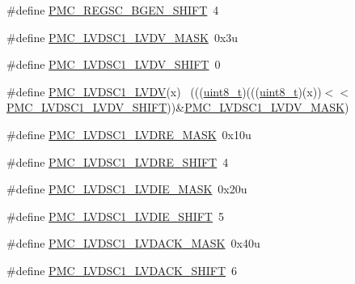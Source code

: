 \begin{DoxyCompactItemize}
\item 
\#define \hyperlink{group___p_m_c___register___masks_gab43d258e6864ee3a7a728de1d720f6fe}{P\+M\+C\+\_\+\+R\+E\+G\+S\+C\+\_\+\+B\+G\+E\+N\+\_\+\+S\+H\+I\+FT}~4
\item 
\#define \hyperlink{group___p_m_c___register___masks_ga777eada2a526d88569a30323e9d3e1d3}{P\+M\+C\+\_\+\+L\+V\+D\+S\+C1\+\_\+\+L\+V\+D\+V\+\_\+\+M\+A\+SK}~0x3u
\item 
\#define \hyperlink{group___p_m_c___register___masks_gaaf45daa6de387f93bc57f1218ab17a16}{P\+M\+C\+\_\+\+L\+V\+D\+S\+C1\+\_\+\+L\+V\+D\+V\+\_\+\+S\+H\+I\+FT}~0
\item 
\#define \hyperlink{group___p_m_c___register___masks_gaa14e8452bdb4c61c57ed23eda94f715a}{P\+M\+C\+\_\+\+L\+V\+D\+S\+C1\+\_\+\+L\+V\+DV}(x)                                          ~(((\hyperlink{_p_e___types_8h_aba7bc1797add20fe3efdf37ced1182c5}{uint8\+\_\+t})(((\hyperlink{_p_e___types_8h_aba7bc1797add20fe3efdf37ced1182c5}{uint8\+\_\+t})(x))$<$$<$\hyperlink{group___p_m_c___register___masks_gaaf45daa6de387f93bc57f1218ab17a16}{P\+M\+C\+\_\+\+L\+V\+D\+S\+C1\+\_\+\+L\+V\+D\+V\+\_\+\+S\+H\+I\+FT}))\&\hyperlink{group___p_m_c___register___masks_ga777eada2a526d88569a30323e9d3e1d3}{P\+M\+C\+\_\+\+L\+V\+D\+S\+C1\+\_\+\+L\+V\+D\+V\+\_\+\+M\+A\+SK})
\item 
\#define \hyperlink{group___p_m_c___register___masks_gad771f87e373907e3ef60e5fa31001fad}{P\+M\+C\+\_\+\+L\+V\+D\+S\+C1\+\_\+\+L\+V\+D\+R\+E\+\_\+\+M\+A\+SK}~0x10u
\item 
\#define \hyperlink{group___p_m_c___register___masks_ga056ca878a20782f5bf65b3be3e98581d}{P\+M\+C\+\_\+\+L\+V\+D\+S\+C1\+\_\+\+L\+V\+D\+R\+E\+\_\+\+S\+H\+I\+FT}~4
\item 
\#define \hyperlink{group___p_m_c___register___masks_ga1e7518c88ea0037d099124a643788363}{P\+M\+C\+\_\+\+L\+V\+D\+S\+C1\+\_\+\+L\+V\+D\+I\+E\+\_\+\+M\+A\+SK}~0x20u
\item 
\#define \hyperlink{group___p_m_c___register___masks_ga30ca240c9254a7e76123a3cf2bfdc40e}{P\+M\+C\+\_\+\+L\+V\+D\+S\+C1\+\_\+\+L\+V\+D\+I\+E\+\_\+\+S\+H\+I\+FT}~5
\item 
\#define \hyperlink{group___p_m_c___register___masks_ga65d04677ca16ad916563d6673cb8ecaa}{P\+M\+C\+\_\+\+L\+V\+D\+S\+C1\+\_\+\+L\+V\+D\+A\+C\+K\+\_\+\+M\+A\+SK}~0x40u
\item 
\#define \hyperlink{group___p_m_c___register___masks_ga56654042b7934ca0e6c51f21db7d1201}{P\+M\+C\+\_\+\+L\+V\+D\+S\+C1\+\_\+\+L\+V\+D\+A\+C\+K\+\_\+\+S\+H\+I\+FT}~6
\item 
$$
\end{DoxyCompactItemize}
